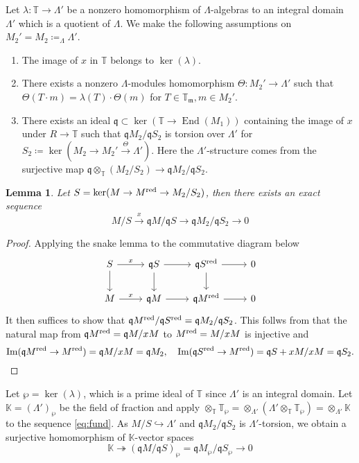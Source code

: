 \documentclass[leqno]{amsart}
\newcommand{\TT}{\mathbb{T}} %
\newcommand{\red}{\textnormal{red}}
\newcommand{\fm}{\mathfrak{m}}
\newcommand{\fq}{\mathfrak{q}}
\DeclareMathOperator{\End}{End}
\DeclareMathOperator{\Image}{Im}
\newtheorem{lem}[thm]{Lemma}
\theoremstyle{definition}
\theoremstyle{remark}
\begin{document}
Let $\lambda\colon \TT\to \Lambda'$
be a nonzero homomorphism of $\Lambda$-algebras
to an integral domain $\Lambda'$
which is a quotient of  $\Lambda$.
We make the following assumptions
on $M_2'=M_2\coloneqq_{\Lambda}\Lambda'$.
\begin{enumerate}[label=(C\roman*)]
\item The image of $x$ in  $\TT$ belongs to  $\ker(\lambda)$.
	\label{cond:C1}
\item There exists a nonzero 
$\Lambda$-modules homomorphism
$\Theta\colon M_2'\to \Lambda'$  such that 
$\Theta(T\cdot m)=\lambda(T)\cdot \Theta(m)$
for $T\in \TT_{\fm}, m\in M_2'$.
	\label{cond:C2}
\item There exists an ideal 
$\fq\subset \ker(\TT\to \End(M_1))$
containing the image of $x$ under $R\to \TT$
such that $\fq M_2/\fq S_2$
is torsion over $\Lambda'$ for 
$S_2\coloneqq\ker(M_2\to M_2'\xrightarrow{\Theta}\Lambda')$.
Here the $\Lambda'$-structure comes from the surjective
map  $\fq\otimes_{\TT}(M_2/S_2)\to \fq M_2/\fq S_2$.
	\label{cond:C3}

\end{enumerate}

\begin{lem}
Let $S=\ker(M\to M^{\red}\to M_2/S_2)$,
then there exists an exact sequence
\begin{equation}\label{eq:fund}
	M/S\xrightarrow{x} \fq M/\fq S\to 
	\fq M_2/\fq S_2 \to 0
\end{equation}
\end{lem}
\begin{proof}

Applying the snake lemma to 
the commutative diagram below
\[
\begin{tikzcd}
	S\arrow[r,"x"] \arrow[d]
	& \fq S \arrow[r] \arrow[d]
	& \fq S^{\red} \arrow[r] \arrow[d] & 0\\
	M\arrow[r,"x"]
	& \fq M \arrow[r]
	& \fq M^{\red} \arrow[r] & 0
\end{tikzcd}
\]
It then suffices to show that 
$\fq M^{\red}/\fq S^{\red}=\fq M_2/\fq S_2$.
This follws from that the natural map from
$\fq M^{\red}=\fq M/xM$ to $M^{\red}=M/xM$
is injective and
\[
	\Image(\fq M^{\red}\to M^{\red})=\fq M/xM=\fq M_2,\quad
	\Image(\fq S^{\red}\to M^{\red})=\fq S+xM/xM=\fq S_2.
\]

\end{proof}

Let $\wp=\ker(\lambda)$,
which is a prime ideal of $\TT$
since $\Lambda'$ is an integral domain.
Let $\mathbb{K}=(\Lambda')_{\wp}$ 
be the field of fraction
and apply 
$\otimes_{\TT}\TT_{\wp}=
\otimes_{\Lambda'}(\Lambda'\otimes_{\TT}\TT_\wp)=
\otimes_{\Lambda'}\mathbb{K}$ 
to the sequence \eqref{eq:fund}.
As $M/S\hookrightarrow \Lambda'$
and $\fq M_2/\fq S_2$ is $\Lambda'$-torsion, 
we obtain a surjective homomorphism 
of $\mathbb{K}$-vector spaces
\begin{equation}\label{eq:fund_frac}
	\mathbb{K}\twoheadrightarrow (\fq M/\fq S)_{\wp}
	= \fq M_\wp/\fq S_\wp\to 0
\end{equation}
\end{document}
